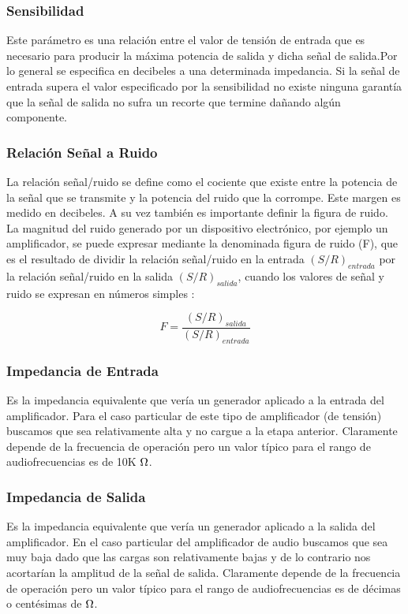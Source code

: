 \subsubsection*{Sensibilidad}

Este parámetro es una relación entre el valor de tensión de entrada que es necesario para producir la máxima potencia de salida y dicha señal de salida.Por lo general se especifica en decibeles a una determinada impedancia. Si la señal de entrada supera el valor especificado por la sensibilidad no existe ninguna garantía que la señal de salida no sufra un recorte que termine dañando algún componente.
\medskip 
\subsubsection*{Relación Señal a Ruido}

La relación señal/ruido se define como el cociente que existe entre la potencia de la señal que se transmite y la potencia del ruido que la corrompe. Este margen es medido en decibeles. A su vez también es importante definir la figura de ruido. La magnitud del ruido generado por un dispositivo electrónico, por ejemplo un amplificador, se puede expresar mediante la denominada figura de ruido (F), que es el resultado de dividir la relación señal/ruido en la entrada $(S/R)_{entrada}$ por la relación señal/ruido en la salida $(S/R)_{salida}$, cuando los valores de señal y ruido se expresan en números simples :

\begin{equation}
F=\frac{(S/R)_{salida}}{(S/R)_{entrada}}
\end{equation}
\medskip 
\subsubsection*{Impedancia de Entrada}


 Es la impedancia equivalente que vería un generador aplicado a la entrada del amplificador. Para el caso particular de este tipo de amplificador (de tensión) buscamos que sea relativamente alta y no cargue a la etapa anterior. Claramente depende de la frecuencia de operación pero un valor típico para el rango de audiofrecuencias es de 10K $\ohm$.
\medskip 
\subsubsection*{Impedancia de Salida}


Es la impedancia equivalente que vería un generador aplicado a la salida del amplificador. En el caso particular del amplificador de audio buscamos que sea muy baja dado que las cargas son relativamente bajas y de lo contrario nos acortarían la amplitud de la señal de salida. Claramente depende de la frecuencia de operación pero un valor típico para el rango de audiofrecuencias es de décimas o centésimas de $\ohm$.
\medskip 
